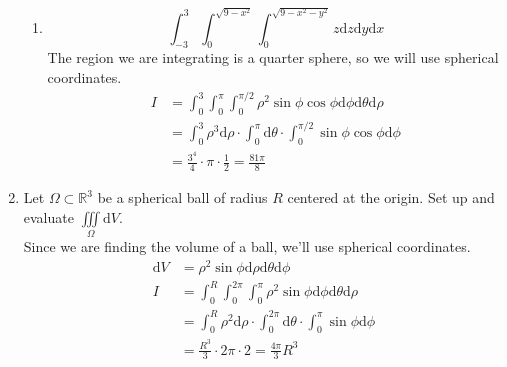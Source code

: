 \begin{enumerate}
\begin{enumerate}[label=\alph*.]
		\item \begin{equation*}
			\int_{-3}^{3}{\int_{0}^{\sqrt{9 - x^2}}{\int_{0}^{\sqrt{9 - x^2 - y^2}}{z\mathrm{d}z}\mathrm{d}y}\mathrm{d}x}
		\end{equation*}
		The region we are integrating is a quarter sphere, so we will use spherical coordinates.
		\begin{align*}
			I &= \int_{0}^{3}{\int_{0}^{\pi}{\int_{0}^{\pi/2}{\rho^2\sin{\phi}\cos{\phi}\mathrm{d}\phi}\mathrm{d}\theta}\mathrm{d}\rho} \\
			&= \int_{0}^{3}{\rho^3\mathrm{d}\rho}\cdot\int_{0}^{\pi}{\mathrm{d}\theta} \cdot \int_{0}^{\pi/2}{\sin{\phi}\cos{\phi}\mathrm{d}\phi} \\
			&= \frac{3^4}{4} \cdot \pi \cdot \frac{1}{2} = \frac{81\pi}{8} 		
		\end{align*}
	\end{enumerate}
	
	\item Let $\Omega \subset \mathbb{R}^3$ be a spherical ball of radius $R$ centered at the origin. Set up and evaluate $\iiint\limits_{\Omega}{\mathrm{d}V}$.\\
	Since we are finding the volume of a ball, we'll use spherical coordinates.
	\begin{align*}
		\mathrm{d}V &= \rho^2\sin{\phi}\mathrm{d}\rho\mathrm{d}\theta\mathrm{d}\phi \\
		I &= \int_{0}^{R}{\int_{0}^{2\pi}{\int_{0}^{\pi}{\rho^2\sin{\phi}\mathrm{d}\phi}\mathrm{d}\theta}\mathrm{d}\rho} \\
		&= \int_{0}^{R}{\rho^2\mathrm{d}\rho} \cdot \int_{0}^{2\pi}{\mathrm{d}\theta} \cdot \int_{0}^{\pi}{\sin{\phi}\mathrm{d}\phi} \\
		&= \frac{R^3}{3} \cdot 2\pi \cdot 2 = \frac{4\pi}{3}R^3	
	\end{align*}
	

\end{enumerate}
